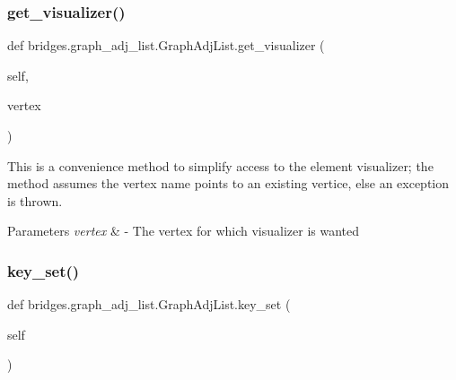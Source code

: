 \mbox{\label{classbridges_1_1graph__adj__list_1_1_graph_adj_list_ad63fce416ec0fdfd99d05e6236807fd8}} 
\subsubsection{\texorpdfstring{get\+\_\+visualizer()}{get\_visualizer()}}
{\footnotesize\ttfamily def bridges.\+graph\+\_\+adj\+\_\+list.\+Graph\+Adj\+List.\+get\+\_\+visualizer (\begin{DoxyParamCaption}\item[{}]{self,  }\item[{}]{vertex }\end{DoxyParamCaption})}



This is a convenience method to simplify access to the element visualizer; the method assumes the vertex name points to an existing vertice, else an exception is thrown. 


\begin{DoxyParams}{Parameters}
{\em vertex} & -\/ The vertex for which visualizer is wanted \\
\hline
\end{DoxyParams}
\mbox{\label{classbridges_1_1graph__adj__list_1_1_graph_adj_list_a96e264e71acad7474e233a1ec1d1035a}} 
\subsubsection{\texorpdfstring{key\+\_\+set()}{key\_set()}}
{\footnotesize\ttfamily def bridges.\+graph\+\_\+adj\+\_\+list.\+Graph\+Adj\+List.\+key\+\_\+set (\begin{DoxyParamCaption}\item[{}]{self }\end{DoxyParamCaption})}

